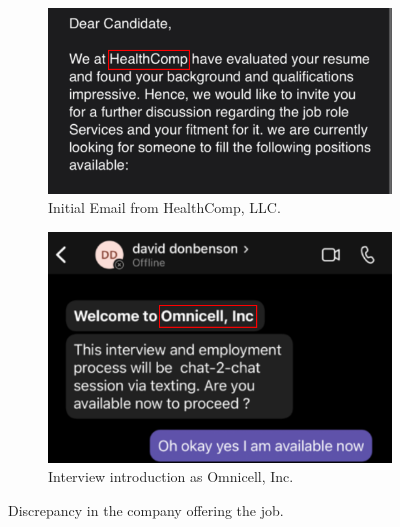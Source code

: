 \begin{fullwidth}
    \begin{figure}[H] %
        \label{sec:Fig8}
        \centering
        \begin{subfigure}{0.5\textwidth}
            \centering
            \includegraphics[width=1.37\linewidth]{assets/Healthcomp.png}
            \captionsetup{justification=centering}
            \caption{Initial Email from HealthComp, LLC.}
        \end{subfigure}
        \hfill
        \begin{subfigure}{0.5\textwidth}
            \centering
            \includegraphics[width=1.37\linewidth]{assets/Omnicell.png}
            \captionsetup{justification=centering}
            \caption{Interview introduction as Omnicell, Inc.}
        \end{subfigure}
        \hfill
        \captionsetup{justification=centering}
        \caption{Discrepancy in the company offering the job.}
    \end{figure}


\end{fullwidth}

